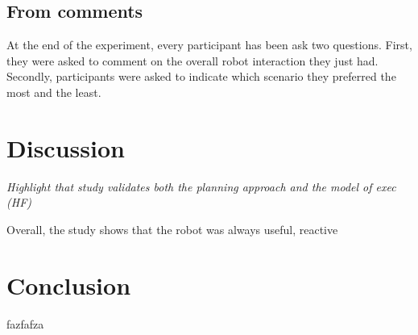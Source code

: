 

\subsection{From comments}

At the end of the experiment, every participant has been ask two questions. First, they were asked to comment on the overall robot interaction they just had. Secondly, participants were asked to indicate which scenario they preferred the most and the least.


\section{Discussion}

\textit{Highlight that study validates both the planning approach and the model of exec (HF)}

Overall, the study shows that the robot was always useful, reactive


\section{Conclusion}

fazfafza